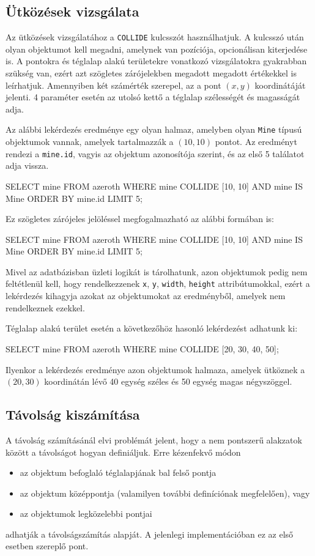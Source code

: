 \subsection{Ütközések vizsgálata}

Az ütközések vizsgálatához a \texttt{COLLIDE} kulcsszót használhatjuk. A kulcsszó után olyan objektumot kell megadni, amelynek van pozíciója, opcionálisan kiterjedése is. A pontokra és téglalap alakú területekre vonatkozó vizsgálatokra gyakrabban szükség van, ezért azt szögletes zárójelekben megadott megadott értékekkel is leírhatjuk. Amennyiben két számérték szerepel, az a pont $(x, y)$ koordinátáját jelenti. 4 paraméter esetén az utolsó kettő a téglalap szélességét és magasságát adja.

Az alábbi lekérdezés eredménye egy olyan halmaz, amelyben olyan \texttt{Mine} típusú objektumok vannak, amelyek tartalmazzák a $(10, 10)$ pontot. Az eredményt rendezi a \texttt{mine.id}, vagyis az objektum azonosítója szerint, és az első 5 találatot adja vissza.
\begin{sql}
SELECT mine
FROM azeroth
WHERE mine COLLIDE [10, 10] AND mine IS Mine
ORDER BY mine.id
LIMIT 5;
\end{sql}
Ez szögletes zárójeles jelöléssel megfogalmazható az alábbi formában is:
\begin{sql}
SELECT mine
FROM azeroth
WHERE mine COLLIDE [10, 10] AND mine IS Mine
ORDER BY mine.id
LIMIT 5;
\end{sql}
Mivel az adatbázisban üzleti logikát is tárolhatunk, azon objektumok pedig nem feltétlenül kell, hogy rendelkezzenek \texttt{x}, \texttt{y}, \texttt{width}, \texttt{height} attribútumokkal, ezért a lekérdezés kihagyja azokat az objektumokat az eredményből, amelyek nem rendelkeznek ezekkel.

Téglalap alakú terület esetén a következőhöz hasonló lekérdezést adhatunk ki:
\begin{sql}
SELECT mine
FROM azeroth
WHERE mine COLLIDE [20, 30, 40, 50];
\end{sql}
Ilyenkor a lekérdezés eredménye azon objektumok halmaza, amelyek ütköznek a $(20, 30)$ koordinátán lévő 40 egység széles és 50 egység magas négyszöggel.

\subsection{Távolság kiszámítása}

A távolság számításánál elvi problémát jelent, hogy a nem pontszerű alakzatok között a távolságot hogyan definiáljuk. Erre kézenfekvő módon
\begin{itemize}
\item az objektum befoglaló téglalapjának bal felső pontja
\item az objektum középpontja (valamilyen további definíciónak megfelelően), vagy
\item az objektumok legközelebbi pontjai
\end{itemize}
adhatják a távolságszámítás alapját. A jelenlegi implementációban ez az első esetben szereplő pont.

